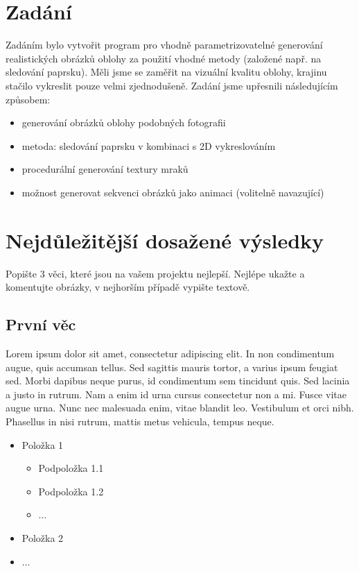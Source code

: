 \documentclass[12pt,a4paper,titlepage,final]{report}
\begin{document}
\chapter{Zadání}

Zadáním bylo vytvořit program pro vhodně parametrizovatelné generování realistických obrázků oblohy za použití vhodné metody (založené např. na sledování paprsku). Měli jsme se zaměřit na vizuální kvalitu oblohy, krajinu stačilo vykreslit pouze velmi zjednodušeně. Zadání jsme upřesnili následujícím způsobem:

\begin{itemize}
    \item generování obrázků oblohy podobných fotografii
    \item metoda: sledování paprsku v kombinaci s 2D vykreslováním
        \item procedurální generování textury mraků
        \item možnost generovat sekvenci obrázků jako animaci (volitelně navazující)
\end{itemize}

\chapter{Nejdůležitější dosažené výsledky}

Popište 3 věci, které jsou na vašem projektu nejlepší. Nejlépe ukažte a
komentujte obrázky, v nejhorším případě vypište textově.

\section{První věc}

Lorem ipsum dolor sit amet, consectetur adipiscing elit. In non condimentum augue, quis accumsan tellus. Sed sagittis mauris tortor, a varius ipsum feugiat sed. Morbi dapibus neque purus, id condimentum sem tincidunt quis. Sed lacinia a justo in rutrum. Nam a enim id urna cursus consectetur non a mi. Fusce vitae augue urna. Nunc nec malesuada enim, vitae blandit leo. Vestibulum et orci nibh. Phasellus in nisi rutrum, mattis metus vehicula, tempus neque.

\begin{itemize}
    \item Položka 1
    \begin{itemize}
        \item Podpoložka 1.1
        \item Podpoložka 1.2
        \item $\ldots$
    \end{itemize}
    \item Položka 2
    \item $\ldots$
\end{itemize}
\end{document}
